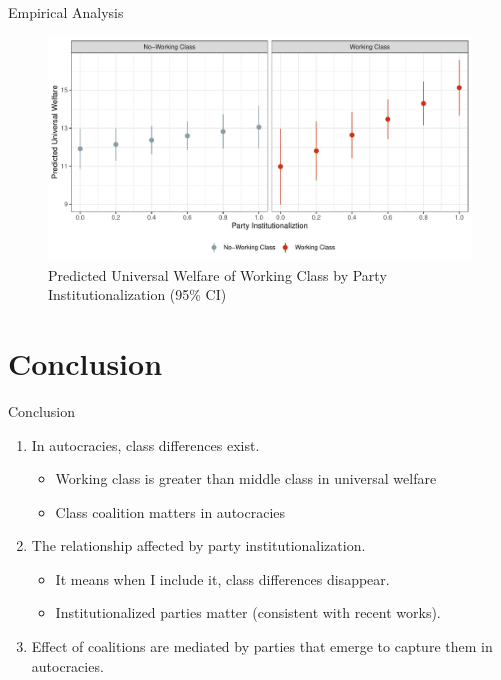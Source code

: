 \documentclass{Bredelebeamer}
\begin{document}
\begin{frame}{Empirical Analysis}
\begin{figure}[!htbt]
	\centering
	\includegraphics[width=1\linewidth]{"../3. Datasets_Codebooks/Figures/Plot5"}
	\caption{Predicted Universal Welfare of Working Class by Party\\Institutionalization (95\% CI)}
	\label{fig:plot6}
\end{figure}
\end{frame}

\section{Conclusion}
\begin{frame}{Conclusion}
\begin{enumerate}
	\item In autocracies, class differences exist.\pause
	\begin{itemize}
		\item Working class is greater than middle class in universal welfare
		\item Class coalition matters in autocracies\pause
	\end{itemize}
	\item The relationship affected by party institutionalization.\pause
	\begin{itemize}
		\item It means when I include it, class differences disappear.
		\item Institutionalized parties matter (consistent with recent works).\pause
	\end{itemize}
	\item Effect of coalitions are mediated by parties that emerge to capture them in autocracies.
\end{enumerate}
\end{frame}
\end{document}
